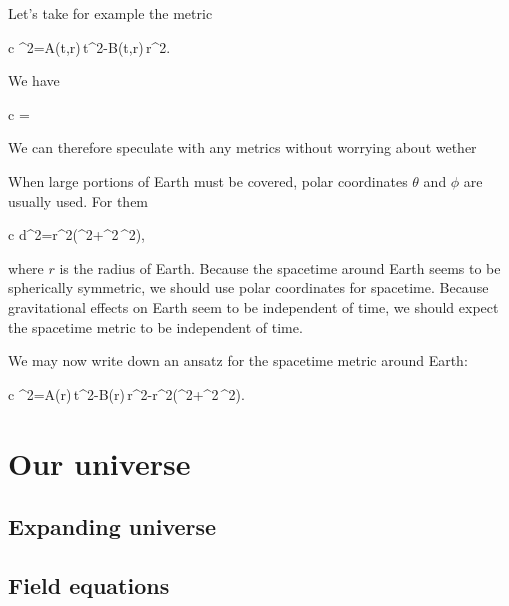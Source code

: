 \documentclass[11pt,oneside%
]{memoir}
\newenvironment{eqna}{\begin{IEEEeqnarray*}{c}}{\end{IEEEeqnarray*}\ignorespacesafterend}
\newcommand{\dd}{\mathrm{d}}
\begin{document}
Let's take for example the metric
\begin{eqna}
\dd\tau^2=A(t,r)\,\dd t^2-B(t,r)\,\dd r^2.
\end{eqna}
We have
\begin{eqna}
\delta\tau=\int\delta\dd\tau
\end{eqna}

We can therefore speculate with any metrics without worrying about wether 

When large portions of Earth must be covered, polar coordinates \(\theta\) and \(\phi\) are usually used. For them
\begin{eqna}
\dd d^2=r^2\left(\dd\theta^2+\sin^2\theta\,\dd\phi^2\right),
\end{eqna}
where \(r\) is the radius of Earth. Because the spacetime around Earth seems to be spherically symmetric, we should use polar coordinates for spacetime. Because gravitational effects on Earth seem to be independent of time, we should expect the spacetime metric to be independent of time.

We may now write down an ansatz for the spacetime metric around Earth:
\begin{eqna}
\dd\tau^2=A(r)\,\dd t^2-B(r)\,\dd r^2-r^2\left(\dd\theta^2+\sin^2\theta\,\dd\phi^2\right).
\end{eqna}


%





\chapter{Our universe}


\section{Expanding universe}


\section{Field equations}
\end{document}
